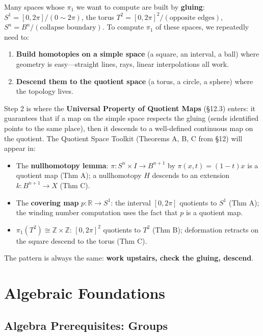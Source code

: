\documentclass[11pt]{report}
\begin{document}
\begin{rembox}
Many spaces whose $\pi_1$ we want to compute are built by \textbf{gluing}: $S^1 = [0, 2\pi]/(0 \sim 2\pi)$, the torus $T^2 = [0, 2\pi]^2/(\text{opposite edges})$, $S^n = B^n/(\text{collapse boundary})$. To compute $\pi_1$ of these spaces, we repeatedly need to:
\begin{enumerate}[nosep]
    \item \textbf{Build homotopies on a simple space} (a square, an interval, a ball) where geometry is easy---straight lines, rays, linear interpolations all work.
    \item \textbf{Descend them to the quotient space} (a torus, a circle, a sphere) where the topology lives.
\end{enumerate}
Step 2 is where the \textbf{Universal Property of Quotient Maps} (\S 12.3) enters: it guarantees that if a map on the simple space respects the gluing (sends identified points to the same place), then it descends to a well-defined continuous map on the quotient. The Quotient Space Toolkit (Theorems A, B, C from \S 12) will appear in:
\begin{itemize}[nosep]
    \item The \textbf{nullhomotopy lemma}: $\pi: S^n \times I \to B^{n+1}$ by $\pi(x,t) = (1-t)x$ is a quotient map (Thm A); a nullhomotopy $H$ descends to an extension $k: B^{n+1} \to X$ (Thm C).
    \item The \textbf{covering map} $p: \mathbb{R} \to S^1$: the interval $[0, 2\pi]$ quotients to $S^1$ (Thm A); the winding number computation uses the fact that $p$ is a quotient map.
    \item \textbf{$\pi_1(T^2) \cong \mathbb{Z} \times \mathbb{Z}$}: $[0, 2\pi]^2$ quotients to $T^2$ (Thm B); deformation retracts on the square descend to the torus (Thm C).
\end{itemize}
The pattern is always the same: \textbf{work upstairs, check the gluing, descend}.
\end{rembox}

\chapter{Algebraic Foundations}

\section{Algebra Prerequisites: Groups}
\end{document}
